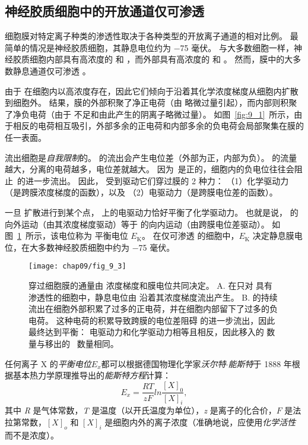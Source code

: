 \subsection{神经胶质细胞中的开放通道仅可渗透~}

细胞膜对特定离子种类的渗透性取决于各种类型的开放离子通道的相对比例。
最简单的情况是神经胶质细胞，其静息电位约为 −75 毫伏。
与大多数细胞一样，神经胶质细胞内部具有高浓度的  和 ，而外部具有高浓度的  和 。
然而，膜中的大多数静息通道仅可渗透 。


由于  在细胞内以高浓度存在，因此它们倾向于沿着其化学浓度梯度从细胞内扩散到细胞外。
结果，膜的外部积聚了净正电荷（由  略微过量引起），而内部则积聚了净负电荷（由于  不足和由此产生的阴离子略微过量）。
如图~\ref{fig:9_1}~所示，由于相反的电荷相互吸引，外部多余的正电荷和内部多余的负电荷会局部聚集在膜的任一表面。


 流出细胞是\textit{自我限制}的。
 的流出会产生电位差（外部为正，内部为负）。
 的流量越大，分离的电荷越多，电位差就越大。
因为~是正的，细胞内的负电位往往会阻止~的进一步流出。
因此， 受到驱动它们穿过膜的 2 种力：
（1）化学驱动力（是跨膜浓度梯度的函数），以及
（2）电驱动力（是跨膜电位差的函数）。


一旦  扩散进行到某个点， 上的电驱动力恰好平衡了化学驱动力。
也就是说， 的向外运动（由其浓度梯度驱动）等于  的向内运动（由跨膜电位差驱动）。
如图~\ref{fig:9_3}~所示，该电位称为  平衡电位 $E_\text{K}$。
在仅可渗透  的细胞中，$E_\text{K}$ 决定静息膜电位，在大多数神经胶质细胞中约为 −75 毫伏。


\begin{figure}[htbp]
	\centering
	\texttt{[image: chap09/fig\_9\_3]}
	\caption{ 穿过细胞膜的通量由  浓度梯度和膜电位共同决定。
		A. 在只对  具有渗透性的细胞中，静息电位由  沿着其浓度梯度流出产生。
		B.  的持续流出在细胞外部积累了过多的正电荷，并在细胞内部留下了过多的负电荷。
		这种电荷的积累导致跨膜的电位差阻碍  的进一步流出，因此最终达到平衡：
		电驱动力和化学驱动力相等且相反，因此移入的  数量与移出的~ 数量相同。}
	\label{fig:9_3}
\end{figure}


任何离子 X 的\textit{平衡电位}$E_x$都可以根据德国物理化学家\textit{沃尔特$\cdot$能斯特}于 1888 年根据基本热力学原理推导出的\textit{能斯特方程}计算：
\begin{equation}\label{eq:9_Nernst_Equation}
	E_x = \frac{RT}{zF} ln \frac{[X]_0}{[X]_i},
\end{equation}
其中 \textit{R} 是气体常数，\textit{T} 是温度（以开氏温度为单位），\textit{z} 是离子的化合价，$ F $ 是法拉第常数，$ [X]_o $ 和 $ [X]_i $ 是细胞内外的离子浓度（准确地说，应使用\textit{化学活性}而不是浓度）。


